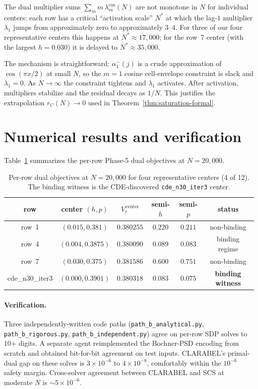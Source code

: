 \documentclass[11pt]{article}
\theoremstyle{plain}
\theoremstyle{definition}
\begin{document}
The dual multiplier sums $\sum_m m\, \lambda_m^{\cos}(N)$ are not
monotone in $N$ for individual centers: each row has a critical
``activation scale'' $N^*$ at which the lag-$1$ multiplier $\lambda_1$
jumps from approximately zero to approximately $3$--$4$. For three of
our four representative centers this happens at $N^* \approx 17{,}000$;
for the row~7 center (with the largest $h = 0.030$) it is delayed to
$N^* \approx 35{,}000$.

The mechanism is straightforward: $\alpha_1^-(j)$ is a crude
approximation of $\cos(\pi x / 2)$ at small $N$, so the $m=1$ cosine
cell-envelope constraint is slack and $\lambda_1 = 0$. As $N \to \infty$
the constraint tightens and $\lambda_1$ activates. After activation,
multipliers stabilize and the residual decays as $1/N$. This justifies
the extrapolation $r_C(N) \to 0$ used in Theorem~\ref{thm:saturation-formal}.

\section{Numerical results and verification}

Table~\ref{tab:results} summarizes the per-row Phase-5 dual objectives
at $N = 20{,}000$.

\begin{table}[h]
\centering
\small
\begin{tabular}{cccccc}
\toprule
row & center $(h, p)$ & $V_r^{\,\text{center}}$ & semi-$h$ & semi-$p$ & status \\
\midrule
row~1 & $(0.015, 0.381)$ & $0.380255$ & $0.220$ & $0.211$ & non-binding \\
row~4 & $(0.004, 0.3875)$ & $0.380090$ & $0.089$ & $0.083$ & binding regime \\
row~7 & $(0.030, 0.375)$ & $0.381586$ & $0.600$ & $0.751$ & non-binding \\
cde\_n30\_iter3 & $(0.000, 0.3901)$ & $0.380318$ & $0.083$ & $0.075$ & \textbf{binding witness} \\
\bottomrule
\end{tabular}
\caption{Per-row dual objectives at $N=20{,}000$ for four representative
centers (4 of 12). The binding witness is the CDE-discovered
\texttt{cde\_n30\_iter3} center.}
\label{tab:results}
\end{table}

\paragraph{Verification.}
Three independently-written code paths (\texttt{path\_b\_analytical.py},
\texttt{path\_b\_rigorous.py}, \texttt{path\_b\_independent.py}) agree
on per-row SDP solves to $10$+ digits. A separate agent reimplemented
the Bochner-PSD encoding from scratch and obtained bit-for-bit
agreement on test inputs. CLARABEL's primal-dual gap on these solves
is $3 \times 10^{-6}$ to $4 \times 10^{-8}$, comfortably within the
$10^{-6}$ safety margin. Cross-solver agreement between CLARABEL and
SCS at moderate $N$ is $\sim 5 \times 10^{-6}$.
\end{document}
